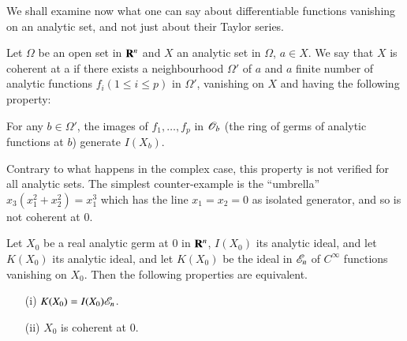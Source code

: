 We shall examine now what one can say about differentiable functions vanishing on an analytic set, and not just about their Taylor series.

\begin{definition}\label{chap6-defi3.9}
Let $\Omega$ be an open set in $\mathbf{R}^{n}$ and $X$ an analytic set in $\Omega$, $a\in X$. We say that $X$ is coherent at a if there exists a neighbourhood $\Omega'$ of $a$ and $a$ finite number of analytic functions $f_{i}(1\leq i\leq p)$ in $\Omega'$, vanishing on $X$ and having the following property:

For any $b\in\Omega'$, the images of $f_{1},\ldots,f_{p}$ in $\mathscr{O}_{b}$ (the ring of germs of analytic functions at $b$) generate $I(X_{b})$.
\end{definition}

Contrary to what happens in the complex case, this property is not verified for all analytic sets. The simplest counter-example is the ``umbrella'' $x_{3}(x^{2}_{1}+x^{2}_{2})=x^{3}_{1}$ which has the line $x_{1}=x_{2}=0$ as isolated generator, and so is not coherent at $0$.

\begin{theorem}\label{chap6-thm3.10}
Let $X_{0}$ be a real analytic germ at $0$ in $\mathbf{R}^{n}$, $I(X_{0})$ its analytic ideal, and let $K(X_{0})$ its analytic ideal, and let $K(X_{0})$ be the ideal in $\mathscr{E}_{n}$ of $C^{\infty}$ functions vanishing on $X_{0}$. Then the following properties are equivalent.
\begin{itemize}
\item[\rm(i)] $K(X_{0})=I(X_{0})\mathscr{E}_{n}$.

\item[\rm(ii)] $X_{0}$ is coherent at $0$.
\end{itemize}
\end{theorem}


